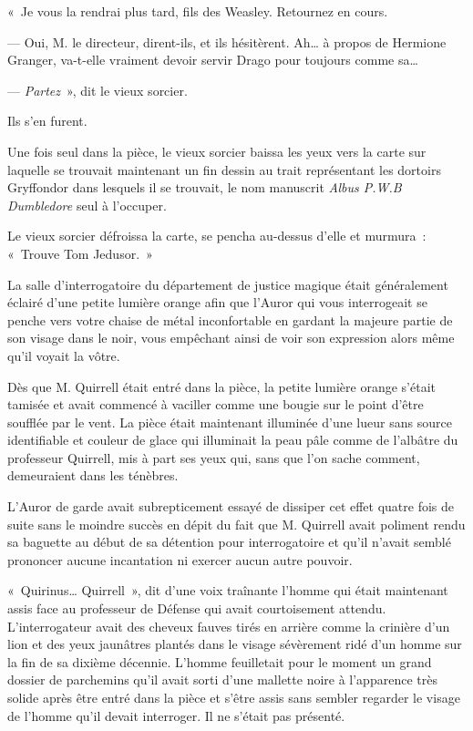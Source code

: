 «~Je vous la rendrai plus tard, fils des Weasley. Retournez en cours.

--- Oui, M. le directeur, dirent-ils, et ils hésitèrent. Ah… à propos de Hermione Granger, va-t-elle vraiment devoir servir Drago pour toujours comme sa…

--- \emph{Partez}~», dit le vieux sorcier.

Ils s'en furent.

Une fois seul dans la pièce, le vieux sorcier baissa les yeux vers la carte sur laquelle se trouvait maintenant un fin dessin au trait représentant les dortoirs Gryffondor dans lesquels il se trouvait, le nom manuscrit \emph{Albus P.W.B Dumbledore} seul à l'occuper.

Le vieux sorcier défroissa la carte, se pencha au-dessus d'elle et murmura~: «~Trouve Tom Jedusor.~»

\later

La salle d'interrogatoire du département de justice magique était généralement éclairé d'une petite lumière orange afin que l'Auror qui vous interrogeait se penche vers votre chaise de métal inconfortable en gardant la majeure partie de son visage dans le noir, vous empêchant ainsi de voir son expression alors même qu'il voyait la vôtre.

Dès que M. Quirrell était entré dans la pièce, la petite lumière orange s'était tamisée et avait commencé à vaciller comme une bougie sur le point d'être soufflée par le vent. La pièce était maintenant illuminée d'une lueur sans source identifiable et couleur de glace qui illuminait la peau pâle comme de l'albâtre du professeur Quirrell, mis à part ses yeux qui, sans que l'on sache comment, demeuraient dans les ténèbres.

L'Auror de garde avait subrepticement essayé de dissiper cet effet quatre fois de suite sans le moindre succès en dépit du fait que M. Quirrell avait poliment rendu sa baguette au début de sa détention pour interrogatoire et qu'il n'avait semblé prononcer aucune incantation ni exercer aucun autre pouvoir.

«~Quirinus… Quirrell~», dit d'une voix traînante l'homme qui était maintenant assis face au professeur de Défense qui avait courtoisement attendu. L'interrogateur avait des cheveux fauves tirés en arrière comme la crinière d'un lion et des yeux jaunâtres plantés dans le visage sévèrement ridé d'un homme sur la fin de sa dixième décennie. L'homme feuilletait pour le moment un grand dossier de parchemins qu'il avait sorti d'une mallette noire à l'apparence très solide après être entré dans la pièce et s'être assis sans sembler regarder le visage de l'homme qu'il devait interroger. Il ne s'était pas présenté.

